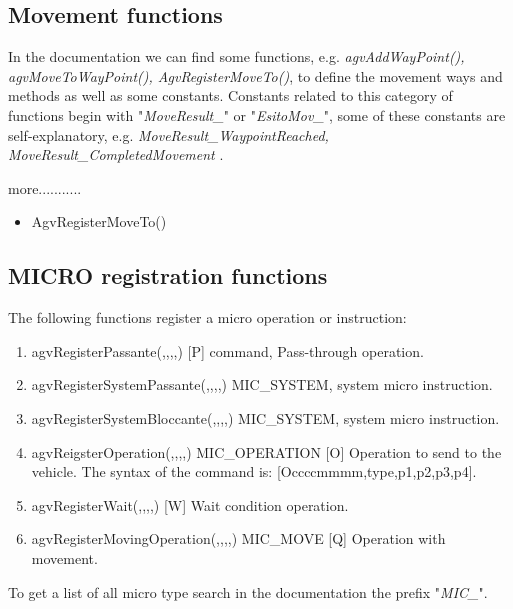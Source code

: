 \subsection{Movement functions}
In the documentation we can find some functions, e.g. \textit{agvAddWayPoint(), agvMoveToWayPoint(), AgvRegisterMoveTo()}, to define the movement ways and methods as well as some constants.
Constants related to this category of functions begin with "\textit{MoveResult\_}" or "\textit{EsitoMov\_}", some of these constants are self-explanatory, e.g. \textit{MoveResult\_WaypointReached, MoveResult\_CompletedMovement }.

more...........
\begin{itemize}
	\item AgvRegisterMoveTo()
\end{itemize}


\subsection{MICRO registration functions}
The following functions register a micro operation or instruction:\\

\begin{enumerate}
	\item agvRegisterPassante(,,,,) [P] command, Pass-through operation.\\
	
	\item agvRegisterSystemPassante(,,,,) MIC\_SYSTEM, system micro instruction.
	\item agvRegisterSystemBloccante(,,,,) MIC\_SYSTEM, system micro instruction.\\
	
	\item agvReigsterOperation(,,,,) MIC\_OPERATION [O] Operation to send to the vehicle. The syntax of the command is: [Occccmmmm,type,p1,p2,p3,p4].\\
	
	\item agvRegisterWait(,,,,) [W] Wait condition operation.\\
	
	\item agvRegisterMovingOperation(,,,,) MIC\_MOVE [Q] Operation with movement.\\
\end{enumerate}

To get a list of all micro type search in the documentation the prefix "\textit{MIC\_}".

